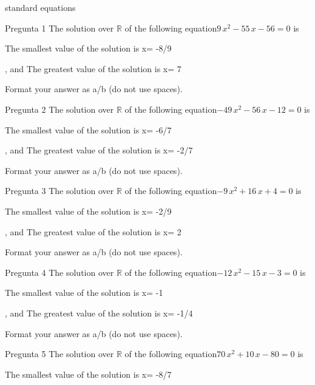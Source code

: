 \begin{quiz}{standard equations }\begin{cloze}{Pregunta 1 } The solution over $\mathbb{R}$ of the following equation$ 9\,x^2-55\,x-56=0  $ is 
\begin{shortanswer}The smallest value of the solution is x=  -8/9 \end{shortanswer}
\begin{shortanswer}, and  The greatest value of the solution is x=  7 \end{shortanswer}
Format your answer as a/b (do not use spaces).\end{cloze}\begin{cloze}{Pregunta 2 } The solution over $\mathbb{R}$ of the following equation$ -49\,x^2-56\,x-12=0  $ is 
\begin{shortanswer}The smallest value of the solution is x=  -6/7 \end{shortanswer}
\begin{shortanswer}, and  The greatest value of the solution is x=  -2/7 \end{shortanswer}
Format your answer as a/b (do not use spaces).\end{cloze}\begin{cloze}{Pregunta 3 } The solution over $\mathbb{R}$ of the following equation$ -9\,x^2+16\,x+4=0  $ is 
\begin{shortanswer}The smallest value of the solution is x=  -2/9 \end{shortanswer}
\begin{shortanswer}, and  The greatest value of the solution is x=  2 \end{shortanswer}
Format your answer as a/b (do not use spaces).\end{cloze}\begin{cloze}{Pregunta 4 } The solution over $\mathbb{R}$ of the following equation$ -12\,x^2-15\,x-3=0  $ is 
\begin{shortanswer}The smallest value of the solution is x=  -1 \end{shortanswer}
\begin{shortanswer}, and  The greatest value of the solution is x=  -1/4 \end{shortanswer}
Format your answer as a/b (do not use spaces).\end{cloze}\begin{cloze}{Pregunta 5 } The solution over $\mathbb{R}$ of the following equation$ 70\,x^2+10\,x-80=0  $ is 
\begin{shortanswer}The smallest value of the solution is x=  -8/7 \end{shortanswer}

\end{cloze}
\end{quiz}
